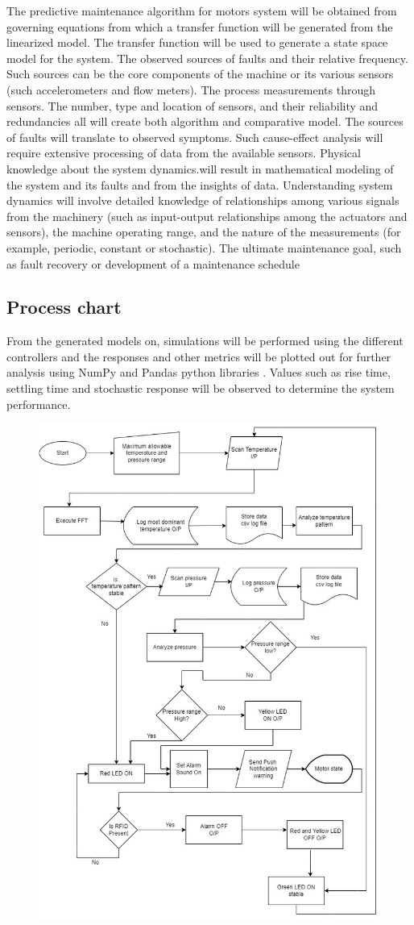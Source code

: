 The predictive maintenance algorithm for motors system will be obtained from governing
equations from which a transfer function will be generated from the linearized model. The
transfer function will be used to generate a state space model for the system.
The observed sources of faults and their relative frequency. Such sources can be the core
components of the machine or its various sensors (such accelerometers and flow meters).
The process measurements through sensors. The number, type and location of sensors,
and their reliability and redundancies all will create both algorithm and comparative
model.
The sources of faults will translate to observed symptoms. Such cause-effect analysis will
require extensive processing of data from the available sensors.
Physical knowledge about the system dynamics.will result in mathematical modeling of
the system and its faults and from the insights of data. Understanding system dynamics
will involve detailed knowledge of relationships among various signals from the machinery
(such as input-output relationships among the actuators and sensors), the machine operating
range, and the nature of the measurements (for example, periodic, constant or stochastic).
The ultimate maintenance goal, such as fault recovery or development of a maintenance
schedule

\subsection{ Process chart}
From the generated models on, simulations will be performed using the different
controllers and the responses and other metrics will be plotted out for further analysis using NumPy and Pandas python libraries .
Values such as rise time, settling time and stochastic response will be observed to determine the system performance.
\begin{figure}
	\centering
	\includegraphics[width=0.7\linewidth]{Figures/model1}
	\caption{}
	\label{fig:model1}
\end{figure}


